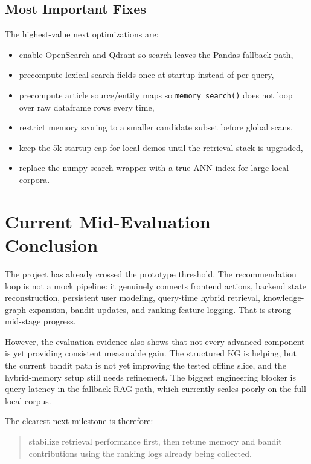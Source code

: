 \documentclass[12pt]{article}
\begin{document}
\subsection{Most Important Fixes}
The highest-value next optimizations are:
\begin{itemize}[leftmargin=1.5em]
  \item enable OpenSearch and Qdrant so search leaves the Pandas fallback path,
  \item precompute lexical search fields once at startup instead of per query,
  \item precompute article source/entity maps so \texttt{memory\_search()} does not loop over raw dataframe rows every time,
  \item restrict memory scoring to a smaller candidate subset before global scans,
  \item keep the 5k startup cap for local demos until the retrieval stack is upgraded,
  \item replace the numpy search wrapper with a true ANN index for large local corpora.
\end{itemize}

\section{Current Mid-Evaluation Conclusion}
The project has already crossed the prototype threshold. The recommendation loop is not a mock pipeline: it genuinely connects frontend actions, backend state reconstruction, persistent user modeling, query-time hybrid retrieval, knowledge-graph expansion, bandit updates, and ranking-feature logging. That is strong mid-stage progress.

However, the evaluation evidence also shows that not every advanced component is yet providing consistent measurable gain. The structured KG is helping, but the current bandit path is not yet improving the tested offline slice, and the hybrid-memory setup still needs refinement. The biggest engineering blocker is query latency in the fallback RAG path, which currently scales poorly on the full local corpus.

The clearest next milestone is therefore:
\begin{quote}
stabilize retrieval performance first, then retune memory and bandit contributions using the ranking logs already being collected.
\end{quote}
\end{document}
